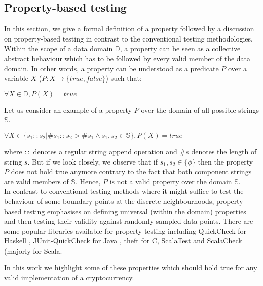
\newcommand{\avector}[2]{(#1_1,#1_2,\ldots,#1_{#2})}
\newcommand{\aDEFvector}[2][a]{(#1_1,#1_2,\ldots,#1_{#2})}

\subsection{Property-based testing}
In this section, we give a formal definition of a property followed by a discussion on property-based testing in contrast to the conventional testing methodologies.\\
Within the scope of a data domain $\mathbb{D}$, a property can be seen as a collective abstract behaviour which has to be followed by every valid member of the data domain. In other words, a property can be understood as a predicate $P$ over a variable $X$ ($P:X \rightarrow \{true, false\}$) such that: 
\begin{center}
$\forall X \in \mathbb{D}, P(X) = true$
\end{center}
Let us consider an example of a property $P$ over the domain of all possible strings $\mathbb{S}$.
\begin{center}
$\forall X \in \{s_1::s_2 | \#s_1::s_2 >  \#s_1 \wedge s_1, s_2 \in \mathbb{S}\}, P(X) = true$
\end{center}
where $::$ denotes a regular string append operation and $\#s$ denotes the length of string $s$. But if we look closely, we observe that if $s_1, s_2 \in \{\phi\}$ then the property $P$ does not hold true anymore contrary to the fact that both component strings are valid members of $\mathbb{S}$. Hence, $P$ is not a valid property over the domain $\mathbb{S}$. \\
In contrast to conventional testing methods where it might suffice to test the behaviour of some boundary points at the discrete neighbourhoods, property-based testing \cite{ron2001property} emphasises on defining universal (within the domain) properties and then testing their validity against randomly sampled data points. There are some popular libraries available for property testing including QuickCheck for Haskell \cite{claessen2011quickcheck}, JUnit-QuickCheck for Java \cite{jung2015quickcheck}, theft for C, ScalaTest \cite{venners2009scalatest} and ScalaCheck \cite{nilsson2014scalacheck} (majorly for Scala.

In this work we highlight some of these properties which should hold true for any valid implementation of a cryptocurrency.
